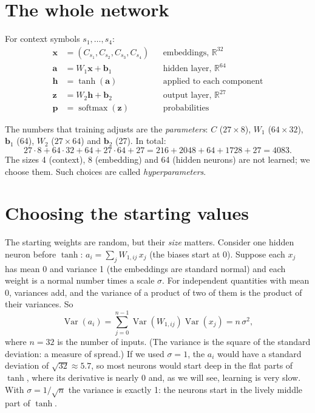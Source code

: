 \documentclass[11pt,a4paper,oneside,openany]{book}
\newcommand{\R}{\mathbb{R}}
\newcommand{\vect}[1]{\mathbf{#1}}
\begin{document}
\section{The whole network}

\begin{mathbox}
For context symbols $s_1, \dots, s_4$:
\begin{align*}
  \vect{x} &= (C_{s_1}, C_{s_2}, C_{s_3}, C_{s_4}) && \text{embeddings, } \R^{32}\\
  \vect{a} &= W_1\vect{x} + \vect{b}_1 && \text{hidden layer, } \R^{64}\\
  \vect{h} &= \tanh(\vect{a}) && \text{applied to each component}\\
  \vect{z} &= W_2\vect{h} + \vect{b}_2 && \text{output layer, } \R^{27}\\
  \vect{p} &= \operatorname{softmax}(\vect{z}) && \text{probabilities}
\end{align*}
\end{mathbox}

The numbers that training adjusts are the \emph{parameters}: $C$
($27\times 8$), $W_1$ ($64\times 32$), $\vect{b}_1$ (64), $W_2$
($27\times 64$) and $\vect{b}_2$ (27). In total:
\[
  27\cdot 8 + 64\cdot 32 + 64 + 27\cdot 64 + 27
  = 216 + 2048 + 64 + 1728 + 27 = 4083 .
\]
The sizes 4 (context), 8 (embedding) and 64 (hidden neurons) are not
learned; we choose them. Such choices are called \emph{hyperparameters}.

\section{Choosing the starting values}

The starting weights are random, but their \emph{size} matters. Consider
one hidden neuron before $\tanh$:
$a_i = \sum_{j} W_{1,ij}\, x_j$ (the biases start at 0). Suppose each
$x_j$ has mean 0 and variance 1 (the embeddings are standard normal) and
each weight is a normal number times a scale $\sigma$. For independent
quantities with mean 0, variances add, and the variance of a product of
two of them is the product of their variances. So
\[
  \operatorname{Var}(a_i) = \sum_{j=0}^{n-1} \operatorname{Var}(W_{1,ij})\operatorname{Var}(x_j)
  = n\,\sigma^2 ,
\]
where $n = 32$ is the number of inputs. (The variance is the square of the
standard deviation: a measure of spread.) If we used $\sigma = 1$, the
$a_i$ would have a standard deviation of $\sqrt{32}\approx 5.7$, so most
neurons would start deep in the flat parts of $\tanh$, where its
derivative is nearly 0 and, as we will see, learning is very slow. With
$\sigma = 1/\sqrt{n}$ the variance is exactly 1: the neurons start in the
lively middle part of $\tanh$.
\end{document}
